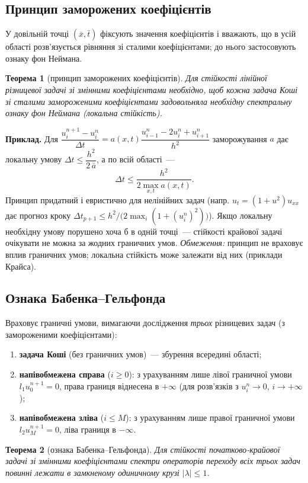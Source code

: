 \documentclass[12pt,a4paper]{article}
\theoremstyle{definition}
\theoremstyle{plain}
\newtheorem*{teorema*}{Теорема}
\newcommand{\abs}[1]{\left\lvert #1 \right\rvert}
\begin{document}
\subsection{Принцип заморожених коефіцієнтів}
У довільній точці $(\bar x,\bar t)$ фіксують значення коефіцієнтів і
вважають, що в усій області розв'язується рівняння зі сталими
коефіцієнтами; до нього застосовують ознаку фон Неймана.
\begin{teorema*}[принцип заморожених коефіцієнтів]
Для стійкості лінійної різницевої задачі зі змінними коефіцієнтами
необхідно, щоб кожна задача Коші зі сталими замороженими коефіцієнтами
задовольняла необхідну спектральну ознаку фон Неймана (\emph{локальна
стійкість}).
\end{teorema*}
\textbf{Приклад.} Для
$\dfrac{u_i^{n+1}-u_i^n}{\Delta t}=a(x,t)\dfrac{u_{i-1}^n-2u_i^n+u_{i+1}^n}{h^2}$
заморожування $a$ дає локальну умову
$\Delta t\le \dfrac{h^2}{2\,\bar a}$, а по всій області~---
\begin{equation}
  \Delta t\le\frac{h^2}{2\max_{x,t}a(x,t)} .
\end{equation}
Принцип придатний і евристично для нелінійних задач (напр.
$u_t=(1+u^2)u_{xx}$ дає прогноз кроку
$\Delta t_{p+1}\le h^2/\big(2\max_i(1+(u_i^n)^2)\big)$). Якщо локальну
необхідну умову порушено хоча б в одній точці~--- стійкості крайової
задачі очікувати не можна за жодних граничних умов. \emph{Обмеження:}
принцип не враховує вплив граничних умов; локальна стійкість може
залежати від них (приклади Крайса).

\subsection{Ознака Бабенка--Гельфонда}
Враховує граничні умови, вимагаючи дослідження \emph{трьох} різницевих
задач (з замороженими коефіцієнтами):
\begin{enumerate}[leftmargin=1.6em]
  \item \textbf{задача Коші} (без граничних умов)~--- збурення всередині
  області;
  \item \textbf{напівобмежена справа} ($i\ge0$): з урахуванням лише лівої
  граничної умови $l_1 u_0^{n+1}=0$, права границя віднесена в $+\infty$
  (для розв'язків з $u_i^n\to0$, $i\to+\infty$);
  \item \textbf{напівобмежена зліва} ($i\le M$): з урахуванням лише правої
  граничної умови $l_2 u_M^{n+1}=0$, ліва границя в $-\infty$.
\end{enumerate}
\begin{teorema*}[ознака Бабенка--Гельфонда]
Для стійкості початково-крайової задачі зі змінними коефіцієнтами
\emph{спектри операторів переходу всіх трьох задач повинні лежати в
замкненому одиничному крузі} $\abs{\lambda}\le1$.
\end{teorema*}
\end{document}
